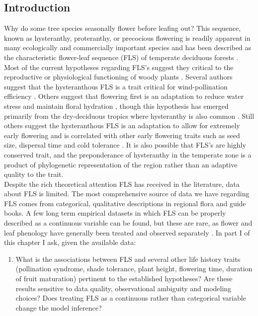 \documentclass{article}\usepackage[]{graphicx}\usepackage[]{color}
\begin{document}
\subsection*{Introduction}
\indent\indent Why do some tree species seasonally flower before leafing out? This sequence, known as hysteranthy, proteranthy, or precocious flowering is readily apparent in many ecologically and commercially important species and has been described as  the characteristic flower-leaf sequence (FLS) of temperate deciduous forests \citep{Rathcke1985}. Most of the current hypotheses regarding FLS's suggest they critical to the reproductive or physiological functioning of woody plants \citep{Gougherty2018}. Several authors suggest that the hysteranthous FLS is a trait critical for wind-pollination efficiency \citep{Whitehead1969,Friedman2009}. Others suggest that flowering first is an adaptation to reduce water stress and maintain floral hydration \citep{Franklin2016}, though this hypothesis has emerged primarily from the dry-deciduous tropics where hysteranthy is also common \citep{Janzen1967,Franklin2016}.  Still others suggest the hysteranthous FLS is an adaptation to allow for extremely early flowering and is correlated with other early flowering traits such as seed size, dispersal time and cold tolerance \citep{Gougherty2018,Bolmgren2003,Primack1987}. It is also possible that FLS's are highly conserved trait, and the preponderance of hysteranthy in the temperate zone is a product of phylogenetic representation of the region rather than an adaptive quality to the trait.\\
\indent Despite the rich theoretical attention FLS has received in the literature, data about FLS is limited. The most comprehensive source of data we have regarding FLS comes from categorical, qualitative descriptions in regional flora and guide books. A few long term empirical datasets in which FLS can be properly described as a continuous variable can be found, but these are rare, as flower and leaf phenology have generally been treated and observed separately \citep{Wolkovich2014}. In part I of this chapter I ask, given the available data:
\begin{enumerate}
\item  What is the associations between FLS and several other life history traits (pollination syndrome, shade tolerance, plant height, flowering time, duration of fruit maturation) pertinent to the established hypotheses? Are these results sensitive to data quality, observational ambiguity and modeling choices? Does treating FLS as a continuous rather than categorical variable change the model inference?
\end{enumerate}
\end{document}
